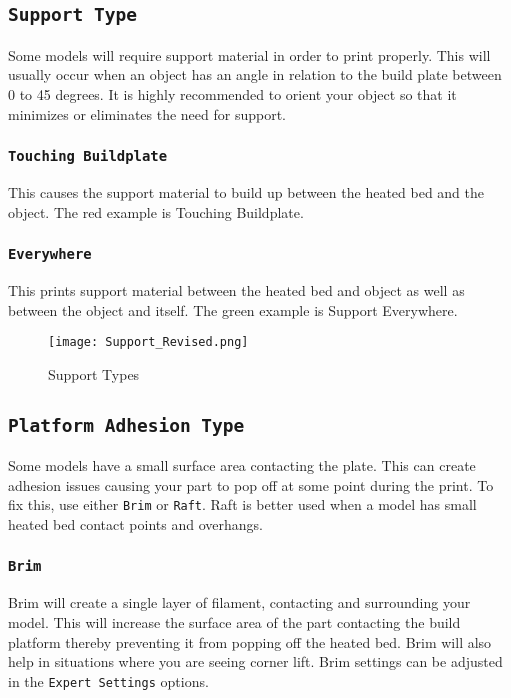 \subsection{\texttt{Support Type}}
Some models will require support material in order to print properly. This will usually occur when an object has an angle in relation to the build plate between 0 to 45 degrees. It is highly recommended to orient your object so that it minimizes or eliminates the need for support.

\subsubsection{\texttt{Touching Buildplate}}
This causes the support material to build up between the heated bed and the object. The red example is Touching Buildplate.

\subsubsection{\texttt{Everywhere}}
This prints support material between the heated bed and object as well as between the object and itself. The green example is Support Everywhere.
\begin{figure}[H]
\centering
\texttt{[image: Support\_Revised.png]}
\caption{Support Types}
\label{fig:Different Types of Support}
\end{figure}

\subsection{\texttt{Platform Adhesion Type}}
Some models have a small surface area contacting the plate. This can create adhesion issues causing your part to pop off at some point during the print. To fix this, use either \texttt{Brim} or \texttt{Raft}. Raft is better used when a model has small heated bed contact points and overhangs.

\subsubsection{\texttt{Brim}}
Brim will create a single layer of filament, contacting and surrounding your model. This will increase the surface area of the part contacting the build platform thereby preventing it from popping off the heated bed. Brim will also help in situations where you are seeing corner lift. Brim settings can be adjusted in the \texttt{Expert Settings} options.


